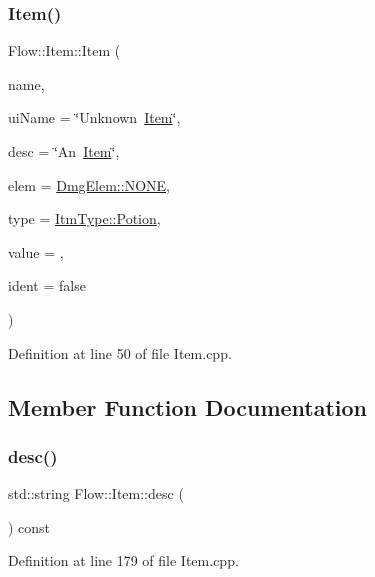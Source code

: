 \subsubsection{\texorpdfstring{Item()}{Item()}\hspace{0.1cm}{\footnotesize\ttfamily [3/3]}}
{\footnotesize\ttfamily Flow\+::\+Item\+::\+Item (\begin{DoxyParamCaption}\item[{std\+::string}]{name,  }\item[{std\+::string}]{ui\+Name = {\ttfamily \char`\"{}Unknown~\hyperlink{class_flow_1_1_item}{Item}\char`\"{}},  }\item[{std\+::string}]{desc = {\ttfamily \char`\"{}An~\hyperlink{class_flow_1_1_item}{Item}\char`\"{}},  }\item[{unsigned char}]{elem = {\ttfamily \hyperlink{namespace_flow_1_1_dmg_elem_a2c7180f371963927ddcc5b333568a33b}{Dmg\+Elem\+::\+N\+O\+NE}},  }\item[{\hyperlink{namespace_flow_ab521722c5aec75faa5be9c5ccfff33d6}{Itm\+Type}}]{type = {\ttfamily \hyperlink{namespace_flow_ab521722c5aec75faa5be9c5ccfff33d6af7f5d540f521d6d642502a9d459e7b16}{Itm\+Type\+::\+Potion}},  }\item[{unsigned char}]{value = {},  }\item[{bool}]{ident = {\ttfamily false} }\end{DoxyParamCaption})}



Definition at line 50 of file Item.\+cpp.



\subsection{Member Function Documentation}
\hypertarget{class_flow_1_1_item_abcef9ab26e69e0a89422a255612e821e}{}\label{class_flow_1_1_item_abcef9ab26e69e0a89422a255612e821e} 
\subsubsection{\texorpdfstring{desc()}{desc()}}
{\footnotesize\ttfamily std\+::string Flow\+::\+Item\+::desc (\begin{DoxyParamCaption}{ }\end{DoxyParamCaption}) const}



Definition at line 179 of file Item.\+cpp.

